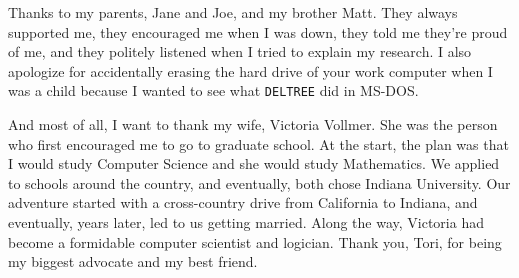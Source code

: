 \begin{acknowledgments}
  Thanks to my parents, Jane and Joe, and my brother Matt. They always supported
  me, they encouraged me when I was down, they told me they're proud of me, and
  they politely listened when I tried to explain my research. I also apologize for
  accidentally erasing the hard drive of your work computer when I was a child because I
  wanted to see what \texttt{DELTREE} did in MS-DOS.

  And most of all, I want to thank my wife, Victoria Vollmer. She was the person
  who first encouraged me to go to graduate school. At the start, the plan was
  that I would study Computer Science and she would study Mathematics. We applied
  to schools around the country, and eventually, both chose Indiana University. Our
  adventure started with a cross-country drive from California to Indiana, and
  eventually, years later, led to us getting married. Along the way, Victoria had
  become a formidable computer scientist and logician. Thank you, Tori, for being
  my biggest advocate and my best friend.

\end{acknowledgments}
